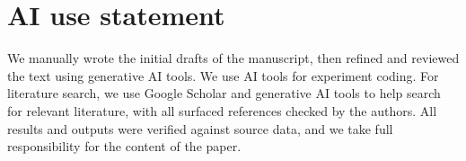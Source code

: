 \section*{AI use statement}
\label{sec:ai-use}

We manually wrote the initial drafts of the manuscript, then refined and reviewed the text using generative AI tools. 
We use AI tools for experiment coding.
For literature search, we use Google Scholar and generative AI tools to help search for relevant literature, with all surfaced references checked by the authors.
All results and outputs were verified against source data, and we take full responsibility for the content of the paper.
